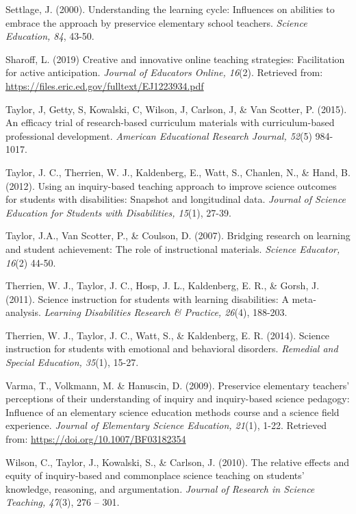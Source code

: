 \documentclass[11.5pt]{sig-alternate} %
\begin{document}
Settlage, J. (2000). Understanding the learning cycle: Influences on abilities to embrace the approach by preservice elementary school teachers. \textit{Science Education, 84}, 43-50. 

Sharoff, L. (2019) Creative and innovative online teaching strategies: Facilitation for active anticipation. \textit{Journal of Educators Online, 16}(2). Retrieved from: \url{https://files.eric.ed.gov/fulltext/EJ1223934.pdf}

Taylor, J, Getty, S, Kowalski, C, Wilson, J, Carlson, J, \& Van Scotter, P. (2015). An efficacy trial of research-based curriculum materials with curriculum-based professional development. \textit{American Educational Research Journal, 52}(5) 984-1017.

Taylor, J. C., Therrien, W. J., Kaldenberg, E., Watt, S., Chanlen, N., \& Hand, B. (2012). Using an inquiry-based teaching approach to improve science outcomes for students with disabilities: Snapshot and longitudinal data. \textit{Journal of Science Education for Students with Disabilities, 15}(1), 27-39.

Taylor, J.A., Van Scotter, P., \& Coulson, D. (2007). Bridging research on learning and student achievement: The role of instructional materials. \textit{Science Educator, 16}(2) 44-50.

Therrien, W. J., Taylor, J. C., Hosp, J. L., Kaldenberg, E. R., \& Gorsh, J. (2011). Science instruction for students with learning disabilities: A meta‐analysis. \textit{Learning Disabilities Research \& Practice, 26}(4), 188-203.

Therrien, W. J., Taylor, J. C., Watt, S., \& Kaldenberg, E. R. (2014). Science instruction for students with emotional and behavioral disorders. \textit{Remedial and Special Education, 35}(1), 15-27.

Varma, T., Volkmann, M. \& Hanuscin, D. (2009). Preservice elementary teachers’ perceptions of their understanding of inquiry and inquiry-based science pedagogy: Influence of an elementary science education methods course and a science field experience. \textit{Journal of Elementary Science Education, 21}(1), 1-22. Retrieved from: \url{https://doi.org/10.1007/BF03182354}

Wilson, C., Taylor, J., Kowalski, S., \& Carlson, J. (2010). The relative effects and equity of inquiry-based and commonplace science teaching on students’ knowledge, reasoning, and argumentation. \textit{Journal of Research in Science Teaching, 47}(3), 276 – 301.
\end{document}

